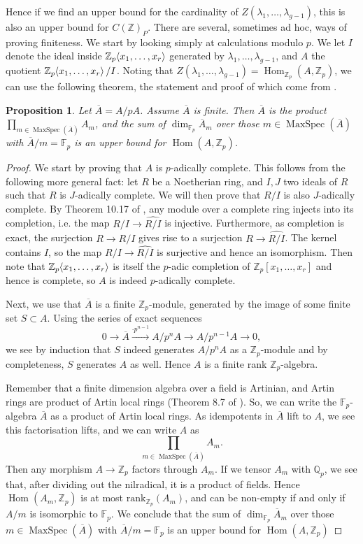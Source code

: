 \documentclass[12pt]{article}
\newcommand{\Z}{\mathbb{Z}}
\newcommand{\Q}{\mathbb{Q}}
\newcommand{\F}{\mathbb{F}}
\renewcommand{\angle}[1]{\hspace{-2pt}\left\langle #1 \right\rangle}
\DeclareMathOperator{\Hom}{Hom}
\DeclareMathOperator{\MaxSpec}{MaxSpec}
\theoremstyle{plain}
\newtheorem{prop}[thm]{Proposition} %
\theoremstyle{definition}
\theoremstyle{remark}
\begin{document}
Hence if we find an upper bound for the cardinality of $Z(\lambda_1,\dots,\lambda_{g-1})$, this is also an upper bound for $C(\Z)_P$. There are several, sometimes ad hoc, ways of proving finiteness. We start by looking simply at calculations modulo $p$. We let $I$ denote the ideal inside $\Z_p\angle{x_1,\dots,x_r}$ generated by $\lambda_1,\dots,\lambda_{g-1}$, and $A$ the quotient $\Z_p\angle{x_1,\dots,x_r}/I$. Noting that $Z(\lambda_1,\dots,\lambda_{g-1}) = \Hom_{\Z_p}(A,\Z_p)$, we can use the following theorem, the statement and proof of which come from \citep{edixhoven20}.

\begin{prop}
\label{prop:finedix}
Let $\overline{A} = A/pA$. Assume $\overline{A}$ is finite. Then $\overline{A}$ is the product $\prod_{m \in \MaxSpec(\overline{A})} A_m$, and the sum of $\dim_{\F_p} \overline{A}_m$ over those $m\in \MaxSpec(\overline{A})$ with $\overline{A}/m = \F_p$ is an upper bound for $\Hom(A,\Z_p)$.
\end{prop}
\begin{proof}
We start by proving that $A$ is $p$-adically complete. This follows from the following more general fact: let $R$ be a Noetherian ring, and $I,J$ two ideals of $R$ such that $R$ is $J$-adically complete. We will then prove that $R/I$ is also $J$-adically complete. By Theorem 10.17 of \cite{atiyah}, any module over a complete ring injects into its completion, i.e. the map $R/I \to \widehat{R/I}$ is injective. Furthermore, as completion is exact, the surjection $R \to R/I$ gives rise to a surjection $R \to \widehat{R/I}$. The kernel contains $I$, so the map $R/I \to \widehat{R/I}$ is surjective and hence an isomorphism. Then note that $\Z_p\angle{x_1,\dots,x_r}$ is itself the $p$-adic completion of $\Z_p[x_1,\dots,x_r]$ and hence is complete, so $A$ is indeed $p$-adically complete.

Next, we use that $\overline{A}$ is a finite $\Z_p$-module, generated by the image of some finite set $S \subset A$. Using the series of exact sequences \[0 \to \overline{A} \xrightarrow{\cdot p^{n-1}} A/p^nA \to A/p^{n-1}A \to 0,\] we see by induction that $S$ indeed generates $A/p^nA$ as a $\Z_p$-module and by completeness, $S$ generates $A$ as well. Hence $A$ is a finite rank $\Z_p$-algebra.

Remember that a finite dimension algebra over a field is Artinian, and Artin rings are product of Artin local rings (Theorem 8.7 of \cite{atiyah}). So, we can write the $\F_p$-algebra $\overline{A}$ as a product of Artin local rings. As idempotents in $\overline{A}$ lift to $A$, we see this factorisation lifts, and we can write $A$ as
\[
\prod_{m \in \MaxSpec(\overline{A})} A_m.
\]
Then any morphism $A \to \Z_p$ factors through $A_m$. If we tensor $A_m$ with $\Q_p$, we see that, after dividing out the nilradical, it is a product of fields. Hence $\Hom(A_m,\Z_p)$ is at most $\text{rank}_{\Z_p}(A_m)$, and can be non-empty if and only if $A/m$ is isomorphic to $\F_p$. We conclude that the sum of $\dim_{\F_p} \overline{A}_m$ over those $m\in \MaxSpec(\overline{A})$ with $\overline{A}/m = \F_p$ is an upper bound for $\Hom(A,\Z_p)$
\end{proof}
\end{document}

